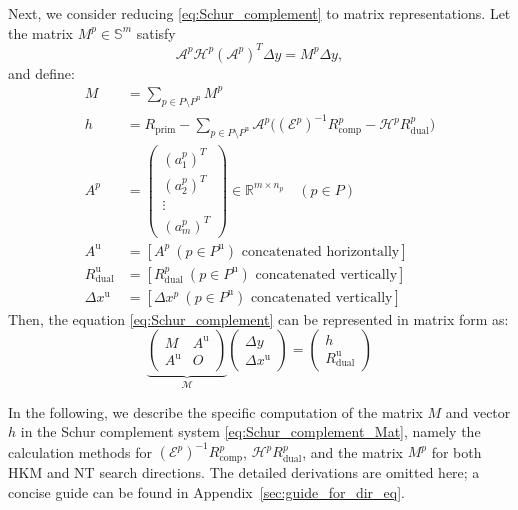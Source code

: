 \medskip

Next, we consider reducing \eqref{eq:Schur_complement} to matrix representations. 
Let the matrix $M^p \in \mathbb{S}^{m}$ satisfy
\[
    \mathcal{A}^p\mathcal{H}^p(\mathcal{A}^p)^T \Delta y= M^p \Delta y,
\]
and define:
\begin{align*}
    M &= \sum_{p \in P \setminus P^{\text{u}}} M^p \\
    h &= R_{\text{prim}} - \sum_{p \in P \setminus P^{\text{u}}} \mathcal{A}^p\big((\mathcal{E}^p)^{-1}R_{\text{comp}}^p - \mathcal{H}^p R_{\text{dual}}^p\big)\\
    A^p &= \begin{pmatrix}
        (a^p_1)^T\\
        (a^p_2)^T\\
        \vdots\\
        (a^p_m)^T
    \end{pmatrix} \in \mathbb{R}^{m\times n_p} \quad (p\in P)\\
    A^{\text{u}} &= [ A^p ~ (p\in P^{\text{u}})\text{ concatenated horizontally} ]\\
    R^{\text{u}}_{\text{dual}} &= [ R^p_{\text{dual}} ~ (p\in P^{\text{u}})\text{ concatenated vertically} ]\\
    \Delta x^{\text{u}} &= [ \Delta x^p ~ (p\in P^{\text{u}})\text{ concatenated vertically} ]
\end{align*}
Then, the equation \eqref{eq:Schur_complement} can be represented in matrix form as:
\begin{equation}
    \underbrace{\left(\begin{array}{cc}
        M   & A^{\text{u}} \\
        A^{\text{u}} & O
    \end{array}\right)}_{\mathcal{M}}
    \left(\begin{array}{c}
        \Delta y   \\
        \Delta x^{\text{u}} 
    \end{array}\right) 
    = 
    \left(\begin{array}{c}
         h  \\
         R_{\text{dual}}^{\text{u}} 
    \end{array}
    \right)
    \label{eq:Schur_complement_Mat}
\end{equation}

\medskip

In the following, we describe the specific computation of the matrix $M$ and vector $h$ in the Schur complement system \eqref{eq:Schur_complement_Mat}, namely the calculation methods for $(\mathcal{E}^p)^{-1}R^p_{\text{comp}}$, $\mathcal{H}^p R^p_{\text{dual}}$, and the matrix $M^p$ for both HKM and NT search directions. 
The detailed derivations are omitted here; a concise guide can be found in Appendix~\ref{sec:guide_for_dir_eq}. 

